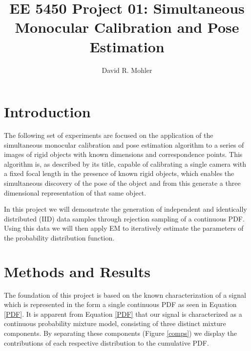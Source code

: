 \documentclass[12pt]{article}
\begin{document}
\title{EE 5450  Project 01: Simultaneous Monocular Calibration and Pose Estimation}

\author{David R. Mohler}


\maketitle

\section{Introduction}
The following set of experiments are focused on the application of the simultaneous monocular calibration and pose estimation algorithm to a series of images of rigid objects with known dimensions and correspondence points. This algorithm is, as described by its title, capable of calibrating a single camera with a fixed focal length in the presence of known rigid objects, which enables the simultaneous discovery of the pose of the object and from this generate a three dimensional representation of that same object.  

In this project we will demonstrate the generation of independent and identically distributed (IID) data samples through rejection sampling of a continuous PDF. Using this data we will then apply EM to iteratively estimate the parameters of the probability distribution function. 

\section{Methods and Results}
The foundation of this project is based on the known characterization of a signal which is represented in the form a single continuous PDF as seen in Equation \ref{PDF}. It is apparent from Equation \ref{PDF} that our signal is characterized as a continuous probability mixture model, consisting of three distinct mixture components. By separating these components (Figure \ref{comps}) we display the contributions of each respective distribution to the cumulative PDF.
\end{document}
